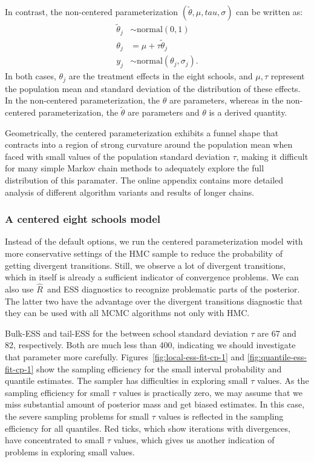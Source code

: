 \documentclass[american,]{article}
\newcommand{\Rhat}{$\widehat{R}$}
\theoremstyle{definition}
\begin{document}
In contrast, the non-centered parameterization
$(\tilde{\theta}, \mu, tau, \sigma)$ can be written as:
\begin{align*}
\tilde{\theta}_j &\sim \text{normal}(0, 1) \\
\theta_j &= \mu + \tau \tilde{\theta}_j \\
y_j &\sim \text{normal}(\theta_j, \sigma_j).
\end{align*}
In both cases, $\theta_j$ are the treatment effects in the eight schools,
and $\mu, \tau$ represent the population mean and standard deviation 
of the distribution of these effects. In the non-centered
parameterization, the $\theta$ are parameters, whereas in the
non-centered parameterization, the $\tilde{\theta}$ are parameters and
$\theta$ is a derived quantity.

Geometrically, the centered parameterization exhibits a funnel shape
that contracts into a region of strong curvature around the population
mean when faced with small
values of the population standard deviation $\tau$, making it difficult for many simple
Markov chain methods to adequately explore the full distribution of this
paramater. The online appendix contains more detailed analysis of different 
algorithm variants and results of longer chains.

\hypertarget{a-centered-eight-schools-model}{%
\subsubsection*{A centered eight schools
model}\label{a-centered-eight-schools-model}}

Instead of the default options, we run the centered parameterization
model with more conservative settings of the HMC sample to reduce the
probability of getting divergent transitions. Still, we observe a lot of divergent
transitions, which in itself is already a sufficient indicator of
convergence problems. We can also use \Rhat\ and ESS
diagnostics to recognize problematic parts of the posterior. The latter
two have the advantage over the divergent transitions diagnostic that they
can be used with all MCMC algorithms not only with HMC.

Bulk-ESS and tail-ESS for the between school standard deviation $\tau$
are 67 and 82, respectively. Both are much less than 400, indicating we
should investigate that parameter more carefully.
Figures~\ref{fig:local-ess-fit-cp-1} and
\ref{fig:quantile-ess-fit-cp-1} show the sampling efficiency for the
small interval probability and quantile estimates.
The sampler has difficulties in exploring small $\tau$ values. As the
sampling efficiency for small $\tau$ values is practically zero, we
may assume that we miss substantial amount of posterior mass and
get biased estimates. In this case, the severe sampling problems for
small $\tau$ values is reflected in the sampling efficiency for all
quantiles. Red ticks, which show iterations with divergences, have
concentrated to small $\tau$ values, which gives us another indication
of problems in exploring small values.
\end{document}
